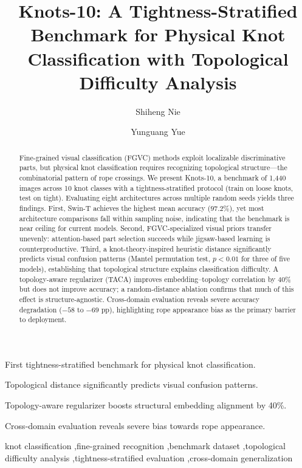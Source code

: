 \documentclass[preprint,review,12pt]{elsarticle}
\begin{document}
\begin{frontmatter}

\title{Knots-10: A Tightness-Stratified Benchmark for Physical Knot Classification with Topological Difficulty Analysis}

\author[inst1]{Shiheng Nie}
\author[inst1]{Yunguang Yue}

\address[inst1]{College of Science, Shihezi University, Shihezi 832003, Xinjiang, China}

\begin{highlights}
\item First tightness-stratified benchmark for physical knot classification.
\item Topological distance significantly predicts visual confusion patterns.
\item Topology-aware regularizer boosts structural embedding alignment by 40\%.
\item Cross-domain evaluation reveals severe bias towards rope appearance.
\end{highlights}

\begin{abstract}
Fine-grained visual classification (FGVC) methods exploit localizable discriminative parts, but physical knot classification requires recognizing topological structure---the combinatorial pattern of rope crossings. We present Knots-10, a benchmark of 1{,}440 images across 10 knot classes with a tightness-stratified protocol (train on loose knots, test on tight). Evaluating eight architectures across multiple random seeds yields three findings. First, Swin-T achieves the highest mean accuracy ($97.2\%$), yet most architecture comparisons fall within sampling noise, indicating that the benchmark is near ceiling for current models. Second, FGVC-specialized visual priors transfer unevenly: attention-based part selection succeeds while jigsaw-based learning is counterproductive. Third, a knot-theory-inspired heuristic distance significantly predicts visual confusion patterns (Mantel permutation test, $p < 0.01$ for three of five models), establishing that topological structure explains classification difficulty. A topology-aware regularizer (TACA) improves embedding--topology correlation by 40\% but does not improve accuracy; a random-distance ablation confirms that much of this effect is structure-agnostic. Cross-domain evaluation reveals severe accuracy degradation ($-58$ to $-69$ pp), highlighting rope appearance bias as the primary barrier to deployment.
\end{abstract}

\begin{keyword}
knot classification \sep fine-grained recognition \sep benchmark dataset \sep topological difficulty analysis \sep tightness-stratified evaluation \sep cross-domain generalization
\end{keyword}

\end{frontmatter}
\end{document}
